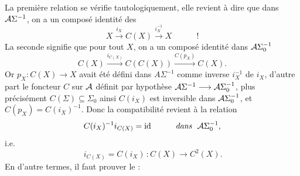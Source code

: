 La première relation se vérifie tautologiquement, elle revient à dire que dans $\mathcal{A}\Sigma^{-1}$, on a un composé identité des
\[
X\xrightarrow{i_X}C(X)\xrightarrow{i_X^{-1}}X\qquad\quad!
\]
La seconde signifie que pour tout $X$, on a un composé identité dans $\mathcal{A}\Sigma_0^{-1}$
\[
C(X)\xrightarrow{i_{C(X)}}C(C(X))\xrightarrow{C(p_X)}C(X).
\]
Or $p_X:C(X)\longrightarrow X$ avait été défini dans $A\Sigma^{-1}$ comme inverse $i_X^{-1}$ de $i_X$, d'autre part le foncteur $C$ sur $\mathcal{A}$ définit par hypothèse $\mathcal{A}\Sigma^{-1}\longrightarrow\mathcal{A}\Sigma_0^{-1}$, plus précisément $C(\Sigma)\subseteq\Sigma_0$ %
ainsi $C(i_X)$ est inversible dans $\mathcal{A}\Sigma_0^{-1}$, et $C(p_X)=C(i_X)^{-1}$. Donc la compatibilité revient à la relation
\[
C(i_X)^{-1}i_{C(X)}=\id\qquad\quad\textit{dans}\ \ \cA\Sigma_0^{-1},
\]
i.e.
\[
\boxed{\,i_{C(X)}=C(i_X)\,}:C(X)\longrightarrow C^2(X).
\]
En d'autre termes, il faut prouver le : %

